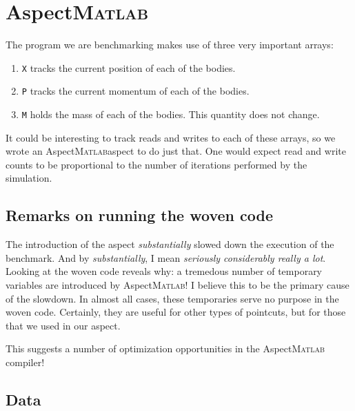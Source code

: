\documentclass[11pt,letterpaper]{article}
\newcommand{\matlab}{\textsc{Matlab}}
\begin{document}
\section{Aspect\matlab}

The program we are benchmarking makes use of three very important arrays:
\begin{enumerate}
    \item
        \texttt{X} tracks the current position of each of the bodies.
    \item
        \texttt{P} tracks the current momentum of each of the bodies.
    \item
        \texttt{M} holds the mass of each of the bodies. This quantity does not
        change.
\end{enumerate}

It could be interesting to track reads and writes to each of these arrays, so
we wrote an Aspect\matlab aspect to do just that. One would expect read and
write counts to be proportional to the number of iterations performed by the
simulation.

\subsection{Remarks on running the woven code}

The introduction of the aspect \emph{substantially} slowed down the execution
of the benchmark. And by \emph{substantially}, I mean \emph{seriously
considerably really a lot}. Looking at the woven code reveals why: a tremedous
number of temporary variables are introduced by Aspect\matlab! I believe this
to be the primary cause of the slowdown. In almost all cases, these temporaries
serve no purpose in the woven code. Certainly, they are useful for other types
of pointcuts, but for those that we used in our aspect.

This suggests a number of optimization opportunities in the Aspect\matlab
compiler!

\subsection{Data}
\end{document}

